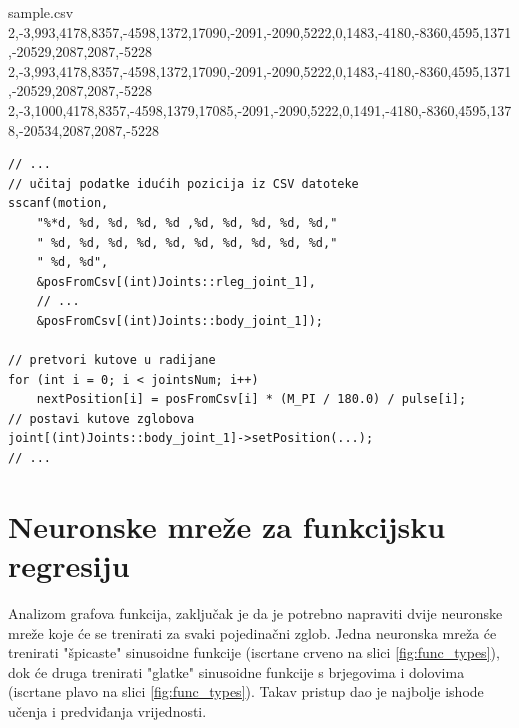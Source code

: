 \documentclass[times, utf8, zavrsni]{fer}
\begin{document}
\begin{filecontents*}{sample.csv}
    2,-3,993,4178,8357,-4598,1372,17090,-2091,-2090,5222,0,1483,-4180,-8360,4595,1371,-20529,2087,2087,-5228
    2,-3,993,4178,8357,-4598,1372,17090,-2091,-2090,5222,0,1483,-4180,-8360,4595,1371,-20529,2087,2087,-5228
    2,-3,1000,4178,8357,-4598,1379,17085,-2091,-2090,5222,0,1491,-4180,-8360,4595,1378,-20534,2087,2087,-5228
\end{filecontents*}




\begin{verbatim}
// ...
// učitaj podatke idućih pozicija iz CSV datoteke
sscanf(motion,
    "%*d, %d, %d, %d, %d ,%d, %d, %d, %d, %d,"
    " %d, %d, %d, %d, %d, %d, %d, %d, %d, %d,"
    " %d, %d",
    &posFromCsv[(int)Joints::rleg_joint_1],
    // ...
    &posFromCsv[(int)Joints::body_joint_1]);

// pretvori kutove u radijane
for (int i = 0; i < jointsNum; i++)
    nextPosition[i] = posFromCsv[i] * (M_PI / 180.0) / pulse[i];
// postavi kutove zglobova
joint[(int)Joints::body_joint_1]->setPosition(...);
// ...
\end{verbatim}


\newpage
\section{Neuronske mreže za funkcijsku regresiju}
Analizom grafova funkcija, zaključak je da je potrebno napraviti dvije neuronske mreže koje će se trenirati za svaki pojedinačni zglob. Jedna neuronska mreža će trenirati "špicaste" sinusoidne funkcije (iscrtane crveno na slici \ref{fig:func_types}), dok će druga trenirati "glatke" sinusoidne funkcije s brjegovima i dolovima (iscrtane plavo na slici \ref{fig:func_types}). Takav pristup dao je najbolje ishode učenja i predviđanja vrijednosti.
\end{document}
